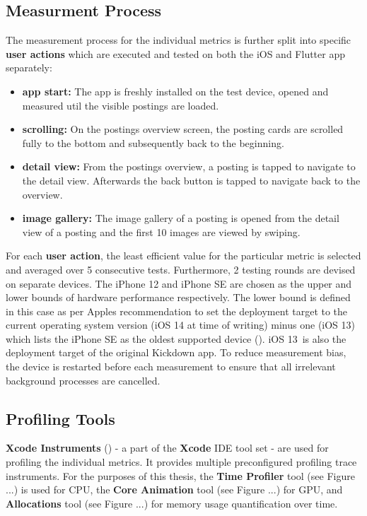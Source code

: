 \subsection{Measurment Process} \label{subsection::measurement_process}
The measurement process for the individual metrics is further split into specific \textbf{user actions} which are executed and tested on both the iOS and Flutter app separately:
\begin{itemize}
    \item \textbf{app start:} The app is freshly installed on the test device, opened and measured util the visible postings are loaded.
    \item \textbf{scrolling:} On the postings overview screen, the posting cards are scrolled fully to the bottom and subsequently back to the beginning.
    \item \textbf{detail view:} From the postings overview, a posting is tapped to navigate to the detail view. Afterwards the back button is tapped to navigate back to the overview.
    \item \textbf{image gallery:} The image gallery of a posting is opened from the detail view of a posting and the first 10 images are viewed by swiping.
\end{itemize}
For each \textbf{user action}, the least efficient value for the particular metric is selected and averaged over 5 consecutive tests. Furthermore, 2 testing rounds are devised on separate devices. 
The iPhone 12 and iPhone SE are chosen as the upper and lower bounds of hardware performance respectively. The lower bound is defined in this case as per Apples recommendation to set the 
deployment target to the current operating system version (iOS 14 at time of writing) minus one (iOS 13) which lists the iPhone SE as the oldest supported device (\cite{Apple2021}). iOS 13~is also the
deployment target of the original Kickdown app.
To reduce measurement bias, the device is restarted before each measurement to ensure that all irrelevant background processes are cancelled.

\subsection{Profiling Tools} \label{subsection::profiling_tooling}
\textbf{Xcode Instruments} (\cite{Apple2019}) - a part of the \textbf{Xcode} IDE tool set - are used for profiling the individual metrics. It provides multiple preconfigured
profiling trace instruments.
For the purposes of this thesis, the \textbf{Time Profiler} tool (see Figure ...) is used for CPU, the \textbf{Core Animation} tool (see Figure ...) for GPU, and 
\textbf{Allocations} tool (see Figure ...) for memory usage quantification over time.

